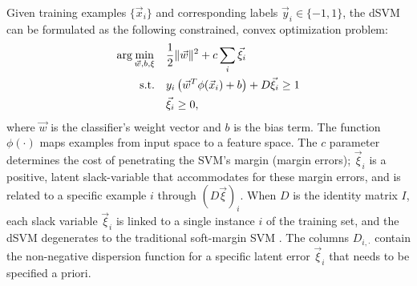 \begin{sloppypar}
Given training examples $\{\vec{x}_i\}$ and corresponding labels $\vec{y}_i \in
\{-1, 1\}$, the \ac{dSVM} can be formulated as the following constrained,
convex optimization problem:
\begin{align}
  \arg\min_{\vec{w},b,\xi} \quad
  & \frac{1}{2}\lVert\vec{w}\rVert^2 
  + c \sum_i \vec{\xi}_i
\\
  \text{s.t.} \quad 
  & y_i \left(\vec{w}^T \phi(\vec{x}_i) + b\right) + D \vec{\xi}_i \ge 1
\\
  & \vec{\xi}_i \ge 0,
\end{align}
%
where $\vec{w}$ is the classifier's weight vector and $b$ is the bias term.
The function $\phi(\cdot)$ maps examples from input space to a feature space.
The $c$ parameter determines the cost of penetrating the \ac{SVM}'s
margin (margin errors); $\vec{\xi}_i$ is a positive, latent slack-variable that
accommodates for these margin errors, and is related to a specific example $i$
through $(D\vec{\xi})_i$. 
%
When $D$ is the identity matrix $I$, each slack variable $\vec{\xi}_i$ is
linked to a single instance $i$ of the training set, and the \ac{dSVM}
degenerates to the traditional soft-margin \ac{SVM} \cite{cortes1995svn}. The
columns $D_{i,\cdot}$ contain the non-negative dispersion function for a
specific latent error $\vec{\xi}_i$ that needs to be specified a priori.
\end{sloppypar}

